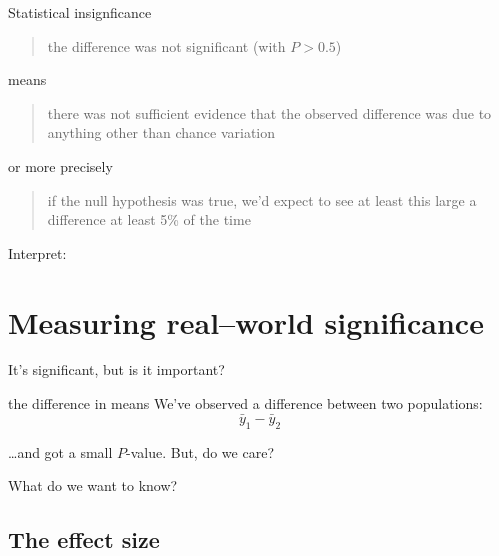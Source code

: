 \begin{frame}{Statistical insignficance}

    \begin{quote}
        the difference was \alert{not} significant (with $P>0.5$)
    \end{quote}

    means
    \begin{quote}
        there was not sufficient evidence that the observed difference was due to anything other than chance variation
    \end{quote}

    or more precisely
    \begin{quote}
        if the null hypothesis was true, we'd expect to see at least this large a difference \alert{at least} 5\% of the time
    \end{quote}

\end{frame}


\begin{frame}{Interpret:}

\end{frame}



\section{Measuring real--world significance}


\begin{frame}{It's significant, but is it important?}


    \begin{block}{the difference in means}
        We've observed a difference between two populations:
        \[  \bar y_1 - \bar y_2 \]
    \end{block}

    \ldots and got a small $P$-value.  But, do we care?

    \vspace{2em}

     What do we want to know?

\end{frame}


\subsection{The effect size}


